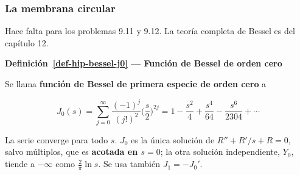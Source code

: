 \documentclass[
  spanish,
  a4paper,
]{scrbook}
\theoremstyle{definition}
\theoremstyle{plain}
\theoremstyle{definition}
\theoremstyle{plain}
\theoremstyle{definition}
\theoremstyle{remark}
\begin{document}
\subsubsection{La membrana circular}\label{la-membrana-circular}

Hace falta para los problemas 9.11 y 9.12. La teoría completa de Bessel
es del capítulo 12.

\begin{tcolorbox}[enhanced jigsaw, arc=.35mm, bottomrule=.15mm, breakable, colback=white, colframe=quarto-callout-note-color-frame, left=2mm, leftrule=.75mm, opacityback=0, rightrule=.15mm, toprule=.15mm]
\begin{minipage}[t]{5.5mm}
\textcolor{quarto-callout-note-color}{\faInfo}
\end{minipage}%
\begin{minipage}[t]{\textwidth - 5.5mm}

\vspace{-3mm}\textbf{Definición~\ref{def-hip-bessel-j0} --- Función de Bessel de orden cero}\vspace{3mm}

Se llama \textbf{función de Bessel de primera especie de orden cero} a

\[
J_0(s) = \sum_{j=0}^{\infty}\frac{(-1)^j}{(j!)^2}\Big(\frac s2\Big)^{2j}
= 1 - \frac{s^2}{4} + \frac{s^4}{64} - \frac{s^6}{2304} + \cdots
\]

La serie converge para todo \(s\). \(J_0\) es la única solución de
\(R'' + R'/s + R = 0\), salvo múltiplos, que es \textbf{acotada en
\(s=0\)}; la otra solución independiente, \(Y_0\), tiende a \(-\infty\)
como \(\tfrac2\pi\ln s\). Se usa también \(J_1 = -J_0'\).

\end{minipage}%
\end{tcolorbox}
\end{document}
